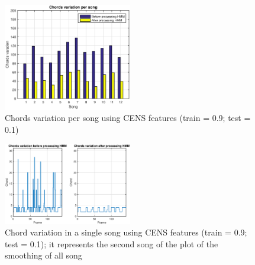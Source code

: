 \begin{figure} [h!]
	\includegraphics[width=0.5\textwidth]{img/Result_HMM/SMOOTHING/SmoothPerSongCENS0109}
	\caption{Chords variation per song using CENS features (train = 0.9; test = 0.1)}
\end{figure}

\begin{figure} [h!]
	\includegraphics[width=0.5\textwidth]{img/Result_HMM/SMOOTHING/SmoothSingleSongCENS0109}
	\caption{Chord variation in a single song using CENS features (train = 0.9; test = 0.1); it represents the second song of the plot of the smoothing of all song}
\end{figure}
